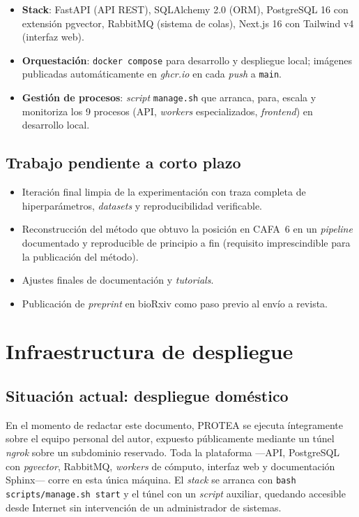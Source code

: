 \documentclass[11pt,a4paper]{article}
\begin{document}
\begin{itemize}[leftmargin=1.5em]
  \item \textbf{Stack}: FastAPI (API REST), SQLAlchemy 2.0 (ORM), PostgreSQL 16
    con extensión pgvector, RabbitMQ (sistema de colas), Next.js 16 con
    Tailwind v4 (interfaz web).
  \item \textbf{Orquestación}: \texttt{docker compose} para desarrollo y
    despliegue local; imágenes publicadas automáticamente en \emph{ghcr.io} en
    cada \emph{push} a \texttt{main}.
  \item \textbf{Gestión de procesos}: \emph{script} \texttt{manage.sh} que
    arranca, para, escala y monitoriza los 9 procesos (API, \emph{workers}
    especializados, \emph{frontend}) en desarrollo local.
\end{itemize}

\subsection{Trabajo pendiente a corto plazo}

\begin{itemize}[leftmargin=1.5em]
  \item Iteración final limpia de la experimentación con traza completa de
    hiperparámetros, \emph{datasets} y reproducibilidad verificable.
  \item Reconstrucción del método que obtuvo la posición en CAFA~6 en un
    \emph{pipeline} documentado y reproducible de principio a fin (requisito
    imprescindible para la publicación del método).
  \item Ajustes finales de documentación y \emph{tutorials}.
  \item Publicación de \emph{preprint} en bioRxiv como paso previo al envío a
    revista.
\end{itemize}

\section{Infraestructura de despliegue}

\subsection{Situación actual: despliegue doméstico}

En el momento de redactar este documento, PROTEA se ejecuta íntegramente
sobre el equipo personal del autor, expuesto públicamente mediante un túnel
\emph{ngrok} sobre un subdominio reservado. Toda la plataforma —API,
PostgreSQL con \emph{pgvector}, RabbitMQ, \emph{workers} de cómputo,
interfaz web y documentación Sphinx— corre en esta única máquina. El
\emph{stack} se arranca con \texttt{bash scripts/manage.sh start} y el túnel
con un \emph{script} auxiliar, quedando accesible desde Internet sin
intervención de un administrador de sistemas.
\end{document}
